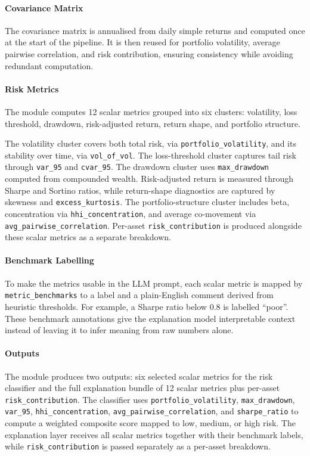 \paragraph{Covariance Matrix}
The covariance matrix is annualised from daily simple returns and computed once at the start of the pipeline. It is then reused for portfolio volatility, average pairwise correlation, and risk contribution, ensuring consistency while avoiding redundant computation.

\paragraph{Risk Metrics}
The module computes 12 scalar metrics grouped into six clusters: volatility, loss threshold, drawdown, risk-adjusted return, return shape, and portfolio structure.

The volatility cluster covers both total risk, via \texttt{portfolio\_volatility}, and its stability over time, via \texttt{vol\_of\_vol}. The loss-threshold cluster captures tail risk through \texttt{var\_95} and \texttt{cvar\_95}. The drawdown cluster uses \texttt{max\_drawdown} computed from compounded wealth. Risk-adjusted return is measured through Sharpe and Sortino ratios, while return-shape diagnostics are captured by skewness and \texttt{excess\_kurtosis}. The portfolio-structure cluster includes beta, concentration via \texttt{hhi\_concentration}, and average co-movement via \texttt{avg\_pairwise\_correlation}. Per-asset \texttt{risk\_contribution} is produced alongside these scalar metrics as a separate breakdown.

\paragraph{Benchmark Labelling}
To make the metrics usable in the LLM prompt, each scalar metric is mapped by \texttt{metric\_benchmarks} to a label and a plain-English comment derived from heuristic thresholds. For example, a Sharpe ratio below 0.8 is labelled “poor”. These benchmark annotations give the explanation model interpretable context instead of leaving it to infer meaning from raw numbers alone.

\paragraph{Outputs}
The module produces two outputs: six selected scalar metrics for the risk classifier and the full explanation bundle of 12 scalar metrics plus per-asset \texttt{risk\_contribution}. The classifier uses \texttt{portfolio\_volatility}, \texttt{max\_drawdown}, \texttt{var\_95}, \texttt{hhi\_concentration}, \texttt{avg\_pairwise\_correlation}, and \texttt{sharpe\_ratio} to compute a weighted composite score mapped to low, medium, or high risk. The explanation layer receives all scalar metrics together with their benchmark labels, while \texttt{risk\_contribution} is passed separately as a per-asset breakdown.

